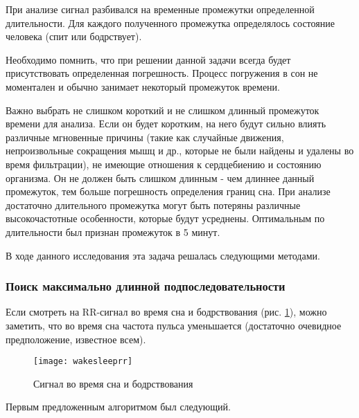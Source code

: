 При анализе сигнал разбивался на временные промежутки определенной длительности. Для каждого полученного промежутка определялось состояние человека (спит или бодрствует). 

Необходимо помнить, что при решении данной задачи всегда будет присутствовать определенная погрешность. Процесс погружения в сон не моментален и обычно занимает некоторый промежуток времени.

Важно выбрать не слишком короткий и не слишком длинный промежуток времени для анализа. Если он будет коротким, на него будут сильно влиять различные мгновенные причины (такие как случайные движения, непроизвольные сокращения мышц и др., которые не были найдены и удалены во время фильтрации), не имеющие отношения к сердцебиению и состоянию организма. Он не должен быть слишком длинным - чем длиннее данный промежуток, тем больше погрешность определения границ сна. При анализе достаточно длительного промежутка могут быть потеряны различные высокочастотные особенности, которые будут усреднены. Оптимальным по длительности был признан промежуток в 5 минут.

В ходе данного исследования эта задача решалась следующими методами.
\subsubsection{Поиск максимально длинной подпоследовательности}

Если смотреть на RR-сигнал во время сна и бодрствования (рис. \ref{ris:rr_sleep_wake}), можно заметить, что во время сна частота пульса уменьшается (достаточно очевидное предположение, известное всем).

\begin{figure}[h]
	\begin{center}
		\texttt{[image: wakesleeprr]}
		\caption{Сигнал во время сна и бодрствования}
		\label{ris:rr_sleep_wake}
	\end{center}
\end{figure}

Первым предложенным алгоритмом был следующий.

